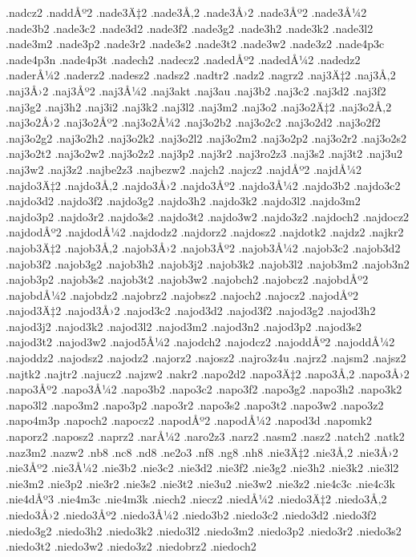 {.nadcz2
.naddÅº2
.nade3Ä‡2
.nade3Å‚2
.nade3Å›2
.nade3Åº2
.nade3Å¼2
.nade3b2
.nade3c2
.nade3d2
.nade3f2
.nade3g2
.nade3h2
.nade3k2
.nade3l2
.nade3m2
.nade3p2
.nade3r2
.nade3s2
.nade3t2
.nade3w2
.nade3z2
.nade4p3c
.nade4p3n
.nade4p3t
.nadech2
.nadecz2
.nadedÅº2
.nadedÅ¼2
.nadedz2
.naderÅ¼2
.naderz2
.nadesz2
.nadsz2
.nadtr2
.nadz2
.nagrz2
.naj3Ä‡2
.naj3Å‚2
.naj3Å›2
.naj3Åº2
.naj3Å¼2
.naj3akt
.naj3au
.naj3b2
.naj3c2
.naj3d2
.naj3f2
.naj3g2
.naj3h2
.naj3i2
.naj3k2
.naj3l2
.naj3m2
.naj3o2
.naj3o2Ä‡2
.naj3o2Å‚2
.naj3o2Å›2
.naj3o2Åº2
.naj3o2Å¼2
.naj3o2b2
.naj3o2c2
.naj3o2d2
.naj3o2f2
.naj3o2g2
.naj3o2h2
.naj3o2k2
.naj3o2l2
.naj3o2m2
.naj3o2p2
.naj3o2r2
.naj3o2s2
.naj3o2t2
.naj3o2w2
.naj3o2z2
.naj3p2
.naj3r2
.naj3ro2z3
.naj3s2
.naj3t2
.naj3u2
.naj3w2
.naj3z2
.najbe2z3
.najbezw2
.najch2
.najcz2
.najdÅº2
.najdÅ¼2
.najdo3Ä‡2
.najdo3Å‚2
.najdo3Å›2
.najdo3Åº2
.najdo3Å¼2
.najdo3b2
.najdo3c2
.najdo3d2
.najdo3f2
.najdo3g2
.najdo3h2
.najdo3k2
.najdo3l2
.najdo3m2
.najdo3p2
.najdo3r2
.najdo3s2
.najdo3t2
.najdo3w2
.najdo3z2
.najdoch2
.najdocz2
.najdodÅº2
.najdodÅ¼2
.najdodz2
.najdorz2
.najdosz2
.najdotk2
.najdz2
.najkr2
.najob3Ä‡2
.najob3Å‚2
.najob3Å›2
.najob3Åº2
.najob3Å¼2
.najob3c2
.najob3d2
.najob3f2
.najob3g2
.najob3h2
.najob3j2
.najob3k2
.najob3l2
.najob3m2
.najob3n2
.najob3p2
.najob3s2
.najob3t2
.najob3w2
.najobch2
.najobcz2
.najobdÅº2
.najobdÅ¼2
.najobdz2
.najobrz2
.najobsz2
.najoch2
.najocz2
.najodÅº2
.najod3Ä‡2
.najod3Å›2
.najod3c2
.najod3d2
.najod3f2
.najod3g2
.najod3h2
.najod3j2
.najod3k2
.najod3l2
.najod3m2
.najod3n2
.najod3p2
.najod3s2
.najod3t2
.najod3w2
.najod5Å¼2
.najodch2
.najodcz2
.najoddÅº2
.najoddÅ¼2
.najoddz2
.najodsz2
.najodz2
.najorz2
.najosz2
.najro3z4u
.najrz2
.najsm2
.najsz2
.najtk2
.najtr2
.najucz2
.najzw2
.nakr2
.napo2d2
.napo3Ä‡2
.napo3Å‚2
.napo3Å›2
.napo3Åº2
.napo3Å¼2
.napo3b2
.napo3c2
.napo3f2
.napo3g2
.napo3h2
.napo3k2
.napo3l2
.napo3m2
.napo3p2
.napo3r2
.napo3s2
.napo3t2
.napo3w2
.napo3z2
.napo4m3p
.napoch2
.napocz2
.napodÅº2
.napodÅ¼2
.napod3d
.napomk2
.naporz2
.naposz2
.naprz2
.narÅ¼2
.naro2z3
.narz2
.nasm2
.nasz2
.natch2
.natk2
.naz3m2
.nazw2
.nb8
.nc8
.nd8
.ne2o3
.nf8
.ng8
.nh8
.nie3Ä‡2
.nie3Å‚2
.nie3Å›2
.nie3Åº2
.nie3Å¼2
.nie3b2
.nie3c2
.nie3d2
.nie3f2
.nie3g2
.nie3h2
.nie3k2
.nie3l2
.nie3m2
.nie3p2
.nie3r2
.nie3s2
.nie3t2
.nie3u2
.nie3w2
.nie3z2
.nie4c3c
.nie4c3k
.nie4dÅº3
.nie4m3c
.nie4m3k
.niech2
.niecz2
.niedÅ¼2
.niedo3Ä‡2
.niedo3Å‚2
.niedo3Å›2
.niedo3Åº2
.niedo3Å¼2
.niedo3b2
.niedo3c2
.niedo3d2
.niedo3f2
.niedo3g2
.niedo3h2
.niedo3k2
.niedo3l2
.niedo3m2
.niedo3p2
.niedo3r2
.niedo3s2
.niedo3t2
.niedo3w2
.niedo3z2
.niedobrz2
.niedoch2
}
